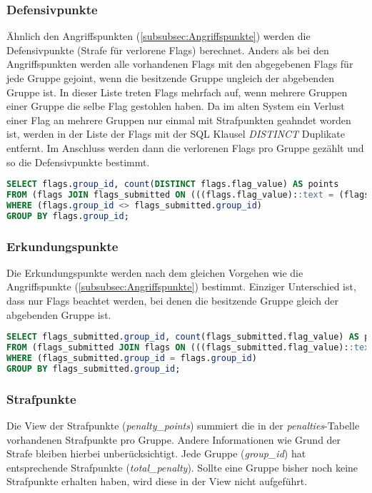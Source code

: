 \subsubsection{Defensivpunkte}
Ähnlich den Angriffspunkten (\ref{subsubsec:Angriffspunkte}) werden die Defensivpunkte (Strafe für verlorene Flags) berechnet.
Anders als bei den Angriffspunkten werden alle vorhandenen Flags mit den abgegebenen Flags für jede Gruppe gejoint, wenn die besitzende Gruppe ungleich der abgebenden Gruppe ist. In dieser Liste treten Flags mehrfach auf, wenn mehrere Gruppen einer Gruppe die selbe Flag gestohlen haben. Da im alten System ein Verlust einer Flag an mehrere Gruppen nur einmal mit Strafpunkten geahndet worden ist, werden in der Liste der Flags mit der SQL Klausel \textit{DISTINCT} Duplikate entfernt. Im Anschluss werden dann die verlorenen Flags pro Gruppe gezählt und so die Defensivpunkte bestimmt.

\begin{lstlisting}[frame=single, language=sql, caption={SQL View Denfensivpunkte}, captionpos=b, label={lst:database-defence-points}]
SELECT flags.group_id, count(DISTINCT flags.flag_value) AS points
FROM (flags JOIN flags_submitted ON (((flags.flag_value)::text = (flags_submitted.flag_value)::text)))
WHERE (flags.group_id <> flags_submitted.group_id)
GROUP BY flags.group_id;
\end{lstlisting}

\subsubsection{Erkundungspunkte}
Die Erkundungspunkte werden nach dem gleichen Vorgehen wie die Angriffspunkte (\ref{subsubsec:Angriffspunkte}) bestimmt. Einziger Unterschied ist, dass nur Flags beachtet werden, bei denen die besitzende Gruppe gleich der abgebenden Gruppe ist.

\begin{lstlisting}[frame=single, language=sql, caption={SQL View Erkundungspunkte}, captionpos=b, label={lst:database-discover-points}]
SELECT flags_submitted.group_id, count(flags_submitted.flag_value) AS points
FROM (flags_submitted JOIN flags ON (((flags_submitted.flag_value)::text = (flags.flag_value)::text)))
WHERE (flags_submitted.group_id = flags.group_id)
GROUP BY flags_submitted.group_id;
\end{lstlisting}

\subsubsection{Strafpunkte}
Die View der Strafpunkte (\textit{penalty\_points}) summiert die in der \textit{penalties}-Tabelle vorhandenen Strafpunkte pro Gruppe. Andere Informationen wie Grund der Strafe bleiben hierbei unberücksichtigt. Jede Gruppe (\textit{group\_id}) hat entsprechende Strafpunkte (\textit{total\_penalty}). Sollte eine Gruppe bisher noch keine Strafpunkte erhalten haben, wird diese in der View nicht aufgeführt.

